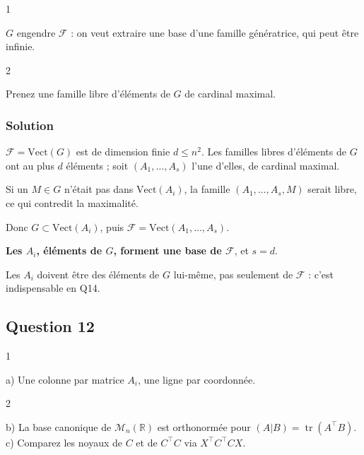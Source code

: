 \documentclass[11pt,a4paper]{article}
\begin{document}
\begin{indication}{1}

\(G\) engendre \(\mathcal{F}\) : on veut extraire une base d'une famille génératrice, qui peut être infinie.

\end{indication}

\begin{indication}{2}

Prenez une famille libre d'éléments de \(G\) de cardinal maximal.

\end{indication}

\hypertarget{solution-10}{%
\subsubsection{Solution}\label{solution-10}}

\(\mathcal{F}=\mathrm{Vect}(G)\) est de dimension finie \(d\leqslant n^2\). Les familles libres d'éléments de \(G\) ont au plus \(d\) éléments ; soit \((A_1,\dots,A_s)\) l'une d'elles, de cardinal maximal.

Si un \(M\in G\) n'était pas dans \(\mathrm{Vect}(A_i)\), la famille \((A_1,\dots,A_s,M)\) serait libre, ce qui contredit la maximalité.

Donc \(G\subset\mathrm{Vect}(A_i)\), puis \(\mathcal{F}=\mathrm{Vect}(A_1,\dots,A_s)\).

\textbf{Les \(A_i\), éléments de \(G\), forment une base de \(\mathcal{F}\)}, et \(s=d\).

\begin{piege}

Les \(A_i\) doivent être des éléments de \(G\) lui-même, pas seulement de \(\mathcal{F}\) : c'est indispensable en Q14.

\end{piege}

\hypertarget{question-12}{%
\subsection{Question 12}\label{question-12}}

\begin{indication}{1}

a) Une colonne par matrice \(A_i\), une ligne par coordonnée.

\end{indication}

\begin{indication}{2}

b) La base canonique de \({\mathcal{M}}_n(\mathbb{R})\) est orthonormée pour \((A|B)=\operatorname{tr}(A^\top B)\). c) Comparez les noyaux de \(C\) et de \(C^\top C\) via \(X^\top C^\top CX\).

\end{indication}
\end{document}

